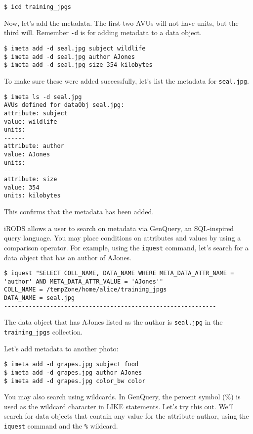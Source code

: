 \documentclass[10pt,oneside]{memoir}
\begin{document}
\begin{lstlisting}
$ icd training_jpgs
\end{lstlisting}

Now, let's add the metadata. The first two AVUs will not have units, but the third will. Remember \texttt{-d} is for adding metadata to a data object.

\begin{lstlisting}
$ imeta add -d seal.jpg subject wildlife
$ imeta add -d seal.jpg author AJones
$ imeta add -d seal.jpg size 354 kilobytes
\end{lstlisting}

To make sure these were added successfully, let's list the metadata for \texttt{seal.jpg}.

\begin{lstlisting}
$ imeta ls -d seal.jpg
AVUs defined for dataObj seal.jpg:
attribute: subject
value: wildlife
units:
------
attribute: author
value: AJones
units:
------
attribute: size
value: 354
units: kilobytes
\end{lstlisting}

This confirms that the metadata has been added.

iRODS allows a user to search on metadata via GenQuery, an SQL-inspired query language. You may place conditions on attributes and values by using a comparison operator. For example, using the \texttt{iquest} command, let's search for a data object that has an author of AJones.

\begin{lstlisting}[basicstyle=\scriptsize\ttfamily]
$ iquest "SELECT COLL_NAME, DATA_NAME WHERE META_DATA_ATTR_NAME = 'author' AND META_DATA_ATTR_VALUE = 'AJones'"
COLL_NAME = /tempZone/home/alice/training_jpgs
DATA_NAME = seal.jpg
------------------------------------------------------------
\end{lstlisting}

The data object that has AJones listed as the author is \texttt{seal.jpg} in the \texttt{training\_jpgs} collection.

Let's add metadata to another photo:

\begin{lstlisting}
$ imeta add -d grapes.jpg subject food
$ imeta add -d grapes.jpg author AJones
$ imeta add -d grapes.jpg color_bw color
\end{lstlisting}

You may also search using wildcards. In GenQuery, the percent symbol (\%) is used as the wildcard character in LIKE statements. Let's try this out. We'll search for data objects that contain any value for the attribute author, using the \texttt{iquest} command and the \texttt{\%} wildcard.
\end{document}
